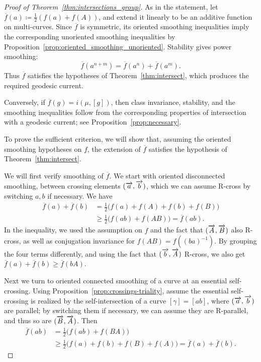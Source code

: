 \begin{proof}[Proof of Theorem~\ref{thm:intersections_group}]
As in the statement, let $\overline{f}(a) \coloneqq
\frac{1}{2}\left(f(a) + f(A) \right)$, and extend it linearly to be an
additive
function on multi-curves. Since $\overline{f}$ is
symmetric, its oriented smoothing inequalities imply the corresponding
unoriented smoothing inequalities by Proposition~\ref{prop:oriented_smoothing_unoriented}. Stability gives
power smoothing:
\[
\overline{f}(a^{n+m})=\overline{f}(a^n)+\overline{f}(a^m).
\]
Thus $\overline{f}$ satisfies the hypotheses of Theorem~\ref{thm:intersect}, which produces the
required geodesic current.

Conversely, if $\overline{f}(g)=i(\mu,[g])$, then class invariance, stability,
and the smoothing inequalities follow from the corresponding
properties of intersection with a geodesic current; see
Proposition~\ref{prop:necessary}.

To prove the sufficient criterion, we will show that, assuming the oriented smoothing hypotheses on $f$, the extension of $\overline{f}$ satisfies the hypothesis of Theorem~\ref{thm:intersect}.

We will first verify smoothing of $\overline{f}$.
We start
with oriented disconnected smoothing, between crossing elements
$(\overrightarrow{a},\overrightarrow{b})$, which we can assume R-cross by switching $a,b$ if
necessary. We have
\begin{align*}
  \overline{f}(a) + \overline{f}(b)
    &= \frac{1}{2}\bigl(f(a) + f(A) + f(b) + f(B)\bigr)\\[2pt]
    &\ge \frac{1}{2}\bigl(f(ab) + f(AB)\bigr) = \overline{f}(ab).
\end{align*}
In the inequality, we used the assumption on $f$ and the fact that
$(\overrightarrow{A},\overrightarrow{B})$ also
R-cross, as well as conjugation invariance for $f(AB) = f((ba)^{-1})$.
By grouping the four terms differently, and using the fact that
$(\overrightarrow{b},\overrightarrow{A})$ R-cross, we also get $\overline{f}(a) +
\overline{f}(b) \ge \overline{f}(bA)$.

Next we turn to oriented connected smoothing of a curve at an
essential self-crossing.
Using Proposition~\ref{prop:crossings-triality}, assume the essential
self-crossing is realized by the self-intersection of a curve
$[\gamma]=[ab]$, where $(\overrightarrow{a},\overrightarrow{b})$ are parallel; by switching
them if necessary, we can assume they are R-parallel, and thus so are
$(\overrightarrow{B},\overrightarrow{A})$. Then
\begin{align*}
  \overline{f}(ab)
    &= \frac{1}{2}\bigl(f(ab) + f(BA)\bigr) \\[2pt]
    &\ge \frac12\bigl(f(a) + f(b) + f(B) + f(A)\bigr)
     = \overline{f}(a) + \overline{f}(b).
\end{align*}


\end{proof}
